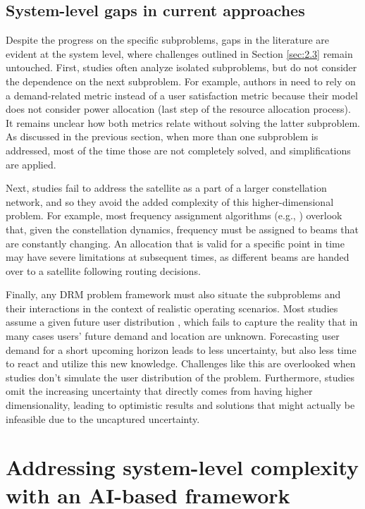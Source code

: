 \documentclass[letterpaper]{article} %
\begin{document}
\subsection{System-level gaps in current approaches}


Despite the progress on the specific subproblems, gaps in the literature are evident at the system level, where challenges outlined in Section \ref{sec:2.3} remain untouched. First, studies often analyze isolated subproblems, but do not consider the dependence on the next subproblem. For example, authors in \cite{Camino2014} need to rely on a demand-related metric instead of a user satisfaction metric because their model does not consider power allocation (last step of the resource allocation process). It remains unclear how both metrics relate without solving the latter subproblem. As discussed in the previous section, when more than one subproblem is addressed, most of the time those are not completely solved, and simplifications are applied.

Next, studies fail to address the satellite as a part of a larger constellation network, and so they avoid the added complexity of this higher-dimensional problem. For example, most frequency assignment algorithms (e.g., \cite{vidal2020joint, liao2020distributed}) overlook that, given the constellation dynamics, frequency must be assigned to beams that are constantly changing. An allocation that is valid for a specific point in time may have severe limitations at subsequent times, as different beams are handed over to a satellite following routing decisions.

Finally, any DRM problem framework must also situate the subproblems and their interactions in the context of realistic operating scenarios.  Most studies assume a given future user distribution \cite{Aravanis2015, Cocco2018}, which fails to capture the reality that in many cases users' future demand and location are unknown. Forecasting user demand for a short upcoming horizon leads to less uncertainty, but also less time to react and utilize this new knowledge. Challenges like this are overlooked when studies don't simulate the user distribution of the problem. Furthermore, studies omit the increasing uncertainty that directly comes from having higher dimensionality, leading to optimistic results and solutions that might actually be infeasible due to the uncaptured uncertainty.






\section{Addressing system-level complexity with an AI-based framework}
\label{sec:4}
\end{document}
